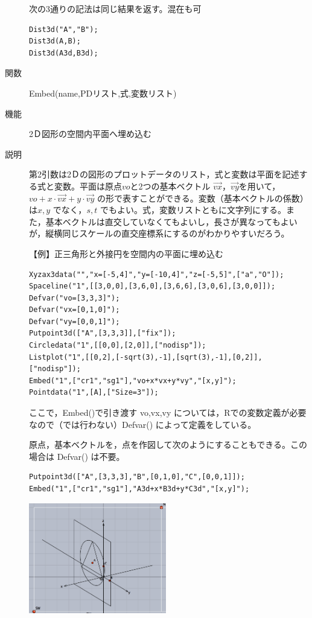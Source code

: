 \documentclass[papersize,a4paper,12pt,uplatex]{jsarticle}
\begin{document}
\begin{description}
次の3通りの記法は同じ結果を返す。混在も可
\begin{verbatim}
Dist3d("A","B");
Dist3d(A,B);
Dist3d(A3d,B3d);
\end{verbatim}

\vspace{\baselineskip}
\hypertarget{embed}{}
\item[関数]Embed(name,PDリスト,式,変数リスト)
\item[機能]2Ｄ図形の空間内平面へ埋め込む
\item[説明]第2引数は2Ｄの図形のプロットデータのリスト，式と変数は平面を記述する式と変数。平面は原点$vo$と2つの基本ベクトル $\overrightarrow{vx}，\overrightarrow{vy}$を用いて，$vo+x \cdot \overrightarrow{vx}+y \cdot \overrightarrow{vy}$ の形で表すことができる。変数（基本ベクトルの係数）は$x,y$ でなく，$s,t$ でもよい。式，変数リストともに文字列にする。また，基本ベクトルは直交していなくてもよいし，長さが異なってもよいが，縦横同じスケールの直交座標系にするのがわかりやすいだろう。

\vspace{\baselineskip}
【例】正三角形と外接円を空間内の平面に埋め込む
\begin{verbatim}
Xyzax3data("","x=[-5,4]","y=[-10,4]","z=[-5,5]",["a","O"]);
Spaceline("1",[[3,0,0],[3,6,0],[3,6,6],[3,0,6],[3,0,0]]);
Defvar("vo=[3,3,3]");
Defvar("vx=[0,1,0]");
Defvar("vy=[0,0,1]");
Putpoint3d(["A",[3,3,3]],["fix"]);
Circledata("1",[[0,0],[2,0]],["nodisp"]);
Listplot("1",[[0,2],[-sqrt(3),-1],[sqrt(3),-1],[0,2]],["nodisp"]);
Embed("1",["cr1","sg1"],"vo+x*vx+y*vy","[x,y]");
Pointdata("1",[A],["Size=3"]);
\end{verbatim}
 \begin{center}  \end{center}

ここで，Embed()で引き渡す vo,vx,vy については，Rでの変数定義が必要なので（\ketcindy では行わない）Defvar() によって定義をしている。

原点，基本ベクトルを，点を作図して次のようにすることもできる。この場合は Defvar() は不要。

\begin{verbatim}
Putpoint3d(["A",[3,3,3],"B",[0,1,0],"C",[0,0,1]]);
Embed("1",["cr1","sg1"],"A3d+x*B3d+y*C3d","[x,y]");
\end{verbatim}
\begin{center}
\includegraphics[bb=0 0 477.02 383.02 , width=6cm]{Fig/embed03.pdf}
\end{center}


\end{description}
\end{document}
